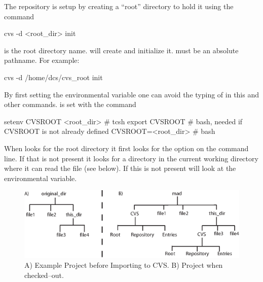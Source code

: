 The \cvs repository is setup by creating a ``root'' directory
to hold it using the command
\begin{example}
  cvs -d <root_dir> init
\end{example}
 is the root directory name. \cvs will create
 and initialize it.  must be an
absolute pathname. For example:
\begin{example}
  cvs -d /home/dcs/cvs_root init
\end{example}

By first setting the  environmental variable one can avoid
the typing of  in this and other commands.
 is set with the command
\begin{example}
  setenv CVSROOT <root_dir> # tcsh
  export CVSROOT            # bash, needed if CVSROOT is not already defined
  CVSROOT=<root_dir>        # bash
\end{example}
When \cvs looks for the \cvs root directory it first looks for the
 option on the command line. If that is not present it looks
for a  directory in the current working directory where it can
read the  file (see below). If this is not present \cvs
will look at the  environmental variable.

\begin{figure}[tb]
\begin{centering}
\includegraphics{cvs.eps}
\caption{A) Example Project before Importing to CVS. B) Project when checked--out.}
\end{centering}
\label{f:cvs}
\end{figure}

